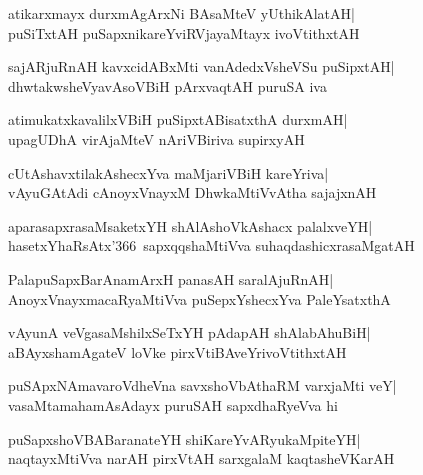 \documentclass[twoside,12pt,openright]{book}
\newcounter{shloka}[chapter]
\begin{document}
\begin{shloka}%
atikarxmayx durxmAgArxNi BAsaMteV yUthikAlatAH|\\
puSiTxtAH puSapxnikareYviRVjayaMtayx ivoVtithxtAH
\end{shloka}

\begin{shloka}%
sajARjuRnAH kavxcidABxMti vanAdedxVsheVSu puSipxtAH|\\
dhwtakwsheVyavAsoVBiH pArxvaqtAH puruSA iva 
\end{shloka}

\begin{shloka}%
atimukatxkavalilxVBiH puSipxtABisatxthA durxmAH|\\
upagUDhA virAjaMteV nAriVBiriva supirxyAH
\end{shloka}

\begin{shloka}%
cUtAshavxtilakAshecxYva maMjariVBiH kareYriva|\\
vAyuGAtAdi cAnoyxVnayxM DhwkaMtiVvAtha sajajxnAH
\end{shloka}

\begin{shloka}%
aparasapxrasaMsaketxYH shAlAshoVkAshacx palalxveYH|\\
hasetxYhaRsAtx\char'366\ sapxqqshaMtiVva suhaqdashicxrasaMgatAH
\end{shloka}

\begin{shloka}%
PalapuSapxBarAnamArxH panasAH saralAjuRnAH|\\
AnoyxVnayxmacaRyaMtiVva puSepxYshecxYva PaleYsatxthA
\end{shloka}

\begin{shloka}%
vAyunA veVgasaMshilxSeTxYH pAdapAH shAlabAhuBiH|\\
aBAyxshamAgateV loVke pirxVtiBAveYrivoVtithxtAH
\end{shloka}

\begin{shloka}%
puSApxNAmavaroVdheVna savxshoVbAthaRM varxjaMti veY|\\
vasaMtamahamAsAdayx puruSAH sapxdhaRyeVva hi
\end{shloka}

\begin{shloka}%
puSapxshoVBABaranateYH shiKareYvARyukaMpiteYH|\\
naqtayxMtiVva narAH pirxVtAH sarxgalaM kaqtasheVKarAH
\end{shloka}
\end{document}
